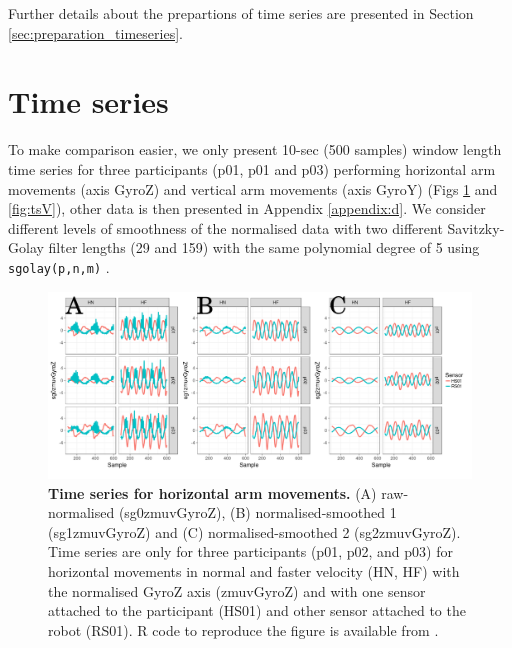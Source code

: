 Further details about the prepartions of time series are presented in
Section \ref{sec:preparation_timeseries}.



\section{Time series}
To make comparison easier, we only present 10-sec (500 samples) window length 
time series for three participants (p01, p01 and p03) performing horizontal 
arm movements (axis GyroZ) and  vertical arm movements (axis GyroY) 
(Figs \ref{fig:tsH} and \ref{fig:tsV}), other data is then presented in 
Appendix \ref{appendix:d}.
We consider different levels of smoothness of the normalised data 
with two different Savitzky-Golay filter lengths (29 and 159) 
with the same polynomial degree of 5 using \texttt{sgolay(p,n,m)} 
\citep{Rsignal}. 
\begin{figure}[!h]
  \centering
\includegraphics[width=1.0\textwidth]{tsHv03}
    	\caption{ 
	{\bf Time series for horizontal arm movements.}
		(A) raw-normalised (sg0zmuvGyroZ), 
		(B) normalised-smoothed 1 (sg1zmuvGyroZ) and
		(C) normalised-smoothed 2 (sg2zmuvGyroZ).
		Time series are only for three participants (p01, p02, and p03) 
		for horizontal movements in normal and faster velocity (HN, HF) 
		with the normalised GyroZ axis (zmuvGyroZ) 
		and with one sensor attached to the participant (HS01) 
		and other sensor attached to the robot (RS01).	
	R code to reproduce the figure is available from \cite{hwum2018}.
        }
    \label{fig:tsH}
\end{figure}
